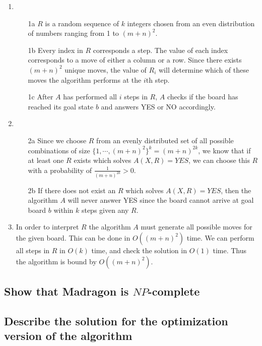 \documentclass[12pt]{article}
\begin{document}
\begin{enumerate}
    \item
        \begin{enumerate}
            \item[1a] $R$ is a random sequence of $k$ integers chosen from an even distribution of numbers ranging from 1 to $(m+n)^2$.
            \item[1b] Every index in $R$ corresponds a step. The value of each index corresponds to a move of either a column or a row. Since there exists $(m+n)^2$ unique moves, the value of $R_i$ will determine which of these moves the algorithm performs at the $i$th step.
            \item[1c] After $A$ has performed all $i$ steps in $R$, $A$ checks if the board has reached its goal state $b$ and answers YES or NO accordingly.
        \end{enumerate}
    \item
        \begin{enumerate}
            \item[2a] Since we choose $R$ from an evenly distributed set of all possible combinations of size $\{1, \cdots, (m+n)^2\}^k = (m+n)^{2k}$, we know that if at least one $R$ exists which solves $A(X, R) = YES$, we can choose this $R$ with a probability of $\frac{1}{(m+n)^{2k}} > 0$.
            \item[2b] If there does not exist an $R$ which solves $A(X, R) = YES$, then the algorithm $A$ will never answer YES since the board cannot arrive at goal board $b$ within $k$ steps given any $R$.
        \end{enumerate}
    \item
        In order to interpret $R$ the algorithm $A$ must generate all possible moves for the given board. This can be done in $O((m+n)^2)$ time. We can perform all steps in $R$ in $O(k)$ time, and check the solution in $O(1)$ time.
        Thus the algorithm is bound by $O((m+n)^2)$.
\end{enumerate}

\subsection{Show that Madragon is $NP$-complete}
\label{sub:Show that Madragon is $NP$-complete}

\subsection{Describe the solution for the optimization version of the algorithm}
\label{sub:Describe the solution for the optimization version of the algorithm}
\end{document}
